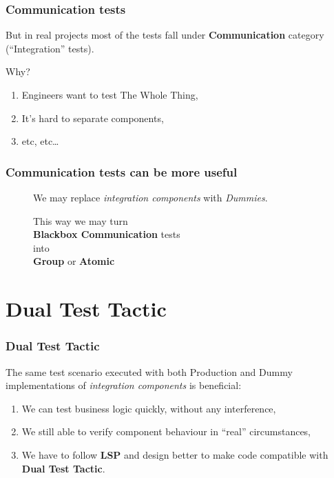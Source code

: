 \documentclass[usenames,dvipsnames]{beamer}
\begin{document}
\begin{frame}
  \frametitle{Communication tests}
  But in real projects most of the tests fall under \textbf{Communication} category  (``Integration'' tests).

  \vspace{0.3cm}
  Why?
  \begin{enumerate}
  \item Engineers want to test The Whole Thing,
  \item It's hard to separate components,
  \item etc, etc\dots
  \end{enumerate}
\end{frame}

\begin{frame}
  \frametitle{Communication tests can be more useful}

  \begin{figure}
  We may replace \textit{integration components} with \textit{Dummies}\footnotemark[1].
  \end{figure}

  \begin{figure}
  This way we may turn \\
  \textbf{Blackbox Communication} tests \\
  into \\
  \textbf{Group} or \textbf{Atomic}
  \end{figure}

\end{frame}


\section{Dual Test Tactic}
\begin{frame}
  \frametitle{Dual Test Tactic}
  The same test scenario executed with both Production and Dummy implementations of \textit{integration components} is beneficial:

  \begin{enumerate}
  \item We can test business logic quickly, without any interference,
  \item We still able to verify component behaviour in ``real'' circumstances,
  \item We have to follow \textbf{LSP} and design better to make code compatible with \textbf{Dual Test Tactic}.
  \end{enumerate}
\end{frame}
\end{document}
